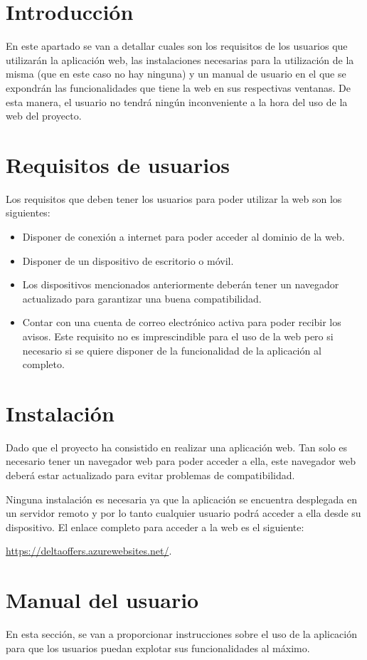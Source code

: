\section{Introducción}
En este apartado se van a detallar cuales son los requisitos de los usuarios que utilizarán la aplicación web, las instalaciones necesarias para la utilización de la misma (que en este caso no hay ninguna) y un manual de usuario en el que se expondrán las funcionalidades que tiene la web en sus respectivas ventanas. De esta manera, el usuario no tendrá ningún inconveniente a la hora del uso de la web del proyecto.
\section{Requisitos de usuarios}
Los requisitos que deben tener los usuarios para poder utilizar la web son los siguientes:

\begin{itemize}
\item Disponer de conexión a internet para poder acceder al dominio de la web.
\item Disponer de un dispositivo de escritorio o móvil.
\item Los dispositivos mencionados anteriormente deberán tener un navegador actualizado para garantizar una buena compatibilidad.
\item Contar con una cuenta de correo electrónico activa para poder recibir los avisos. Este requisito no es imprescindible para el uso de la web pero si necesario si se quiere disponer de la funcionalidad de la aplicación al completo.
\end{itemize}
\section{Instalación}
Dado que el proyecto ha consistido en realizar una aplicación web. Tan solo es necesario tener un navegador web para poder acceder a ella, este navegador web deberá estar actualizado para evitar problemas de compatibilidad. 

Ninguna instalación es necesaria ya que la aplicación se encuentra desplegada en un servidor remoto y por lo tanto cualquier usuario podrá acceder a ella desde su dispositivo. El enlace completo para acceder a la web es el siguiente:

\url{https://deltaoffers.azurewebsites.net/}\label{enlace:web}.

\section{Manual del usuario}
En esta sección, se van a proporcionar instrucciones sobre el uso de la aplicación para que los usuarios puedan explotar sus funcionalidades al máximo.

